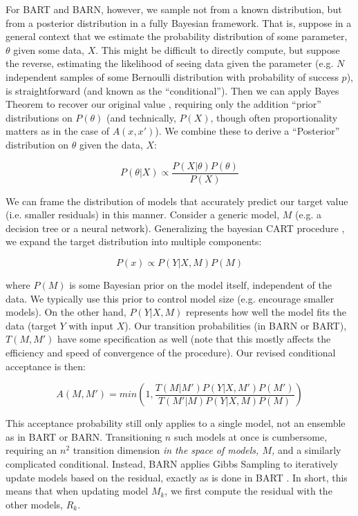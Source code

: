 \documentclass[12pt]{article}
\begin{document}
For BART and BARN, however, we sample not from a known distribution, but from a posterior distribution in a fully Bayesian framework.  That is, suppose in a general context that we estimate the probability distribution of some parameter, $\theta$ given some data, $X$.  This might be difficult to directly compute, but suppose the reverse, estimating the likelihood of seeing data given the parameter (e.g. $N$ independent samples of some Bernoulli distribution with probability of success $p$), is straightforward (and known as the ``conditional'').  Then we can apply Bayes Theorem to recover our original value \cite{casella2021statistical}, requiring only the addition ``prior'' distributions on $P(\theta)$ (and technically, $P(X)$, though often proportionality matters as in the case of $A(x,x')$).  We combine these to derive a ``Posterior'' distribution on $\theta$ given the data, $X$:

$$
P(\theta|X) \propto \frac{P(X|\theta)P(\theta)}{P(X)}
$$


We can frame the distribution of models that accurately predict our target value (i.e. smaller residuals) in this manner.  Consider a generic model, $M$ (e.g. a decision tree or a neural network).  Generalizing the bayesian CART procedure \cite{chipman1998bayesian}, we expand the target distribution into multiple components: 

$$
P(x) \propto P(Y|X,M) P(M)
$$

where $P(M)$ is some Bayesian prior on the model itself, independent of the data.  We typically use this prior to control model size (e.g. encourage smaller models).  On the other hand, $P(Y|X,M)$ represents how well the model fits the data (target $Y$ with input $X$).  Our transition probabilities (in BARN or BART), $T(M,M')$ have some specification as well (note that this mostly affects the efficiency and speed of convergence of the procedure).  Our revised conditional acceptance is then:

$$
A(M,M') = min(1, \frac{T(M|M') P(Y|X,M')P(M')}{T(M'|M) P(Y|X,M)P(M)})
$$

This acceptance probability still only applies to a single model, not an ensemble as in BART or BARN.  Transitioning $n$ such models at once is cumbersome, requiring an $n^2$ transition dimension \emph{in the space of models, $M$,} and a similarly complicated conditional.  Instead, BARN applies Gibbs Sampling to iteratively update models based on the residual, exactly as is done in BART \cite{chipman2010bart}.  In short, this means that when updating model $M_k$, we first compute the residual with the other models, $R_k$.
\end{document}
